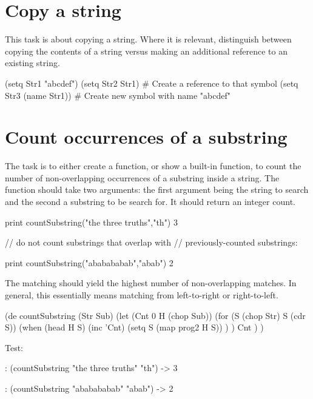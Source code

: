 \pagebreak{}
\section*{Copy a string}

This task is about copying a string. Where it is relevant, distinguish
between copying the contents of a string versus making an additional
reference to an existing string.

\begin{wideverbatim}

(setq Str1 "abcdef")
(setq Str2 Str1)                       # Create a reference to that symbol
(setq Str3 (name Str1))                # Create new symbol with name "abcdef"

\end{wideverbatim}

\pagebreak{}
\section*{Count occurrences of a substring}

The task is to either create a function, or show a built-in function, to
count the number of non-overlapping occurrences of a substring inside a
string. The function should take two arguments: the first argument being
the string to search and the second a substring to be search for. It
should return an integer count.

\begin{wideverbatim}

print countSubstring("the three truths","th")
3

// do not count substrings that overlap with
// previously-counted substrings:

print countSubstring("ababababab","abab")
2

\end{wideverbatim}

The matching should yield the highest number of non-overlapping matches.
In general, this essentially means matching from left-to-right or
right-to-left.


\begin{wideverbatim}

(de countSubstring (Str Sub)
   (let (Cnt 0  H (chop Sub))
      (for (S (chop Str)  S  (cdr S))
         (when (head H S)
            (inc 'Cnt)
            (setq S (map prog2 H S)) ) )
      Cnt ) )

Test:

: (countSubstring "the three truths" "th")
-> 3

: (countSubstring "ababababab" "abab")
-> 2

\end{wideverbatim}

